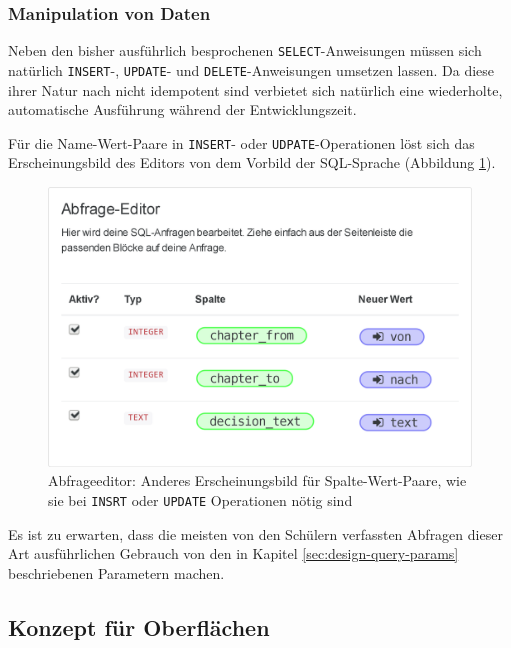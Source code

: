 \subsubsection{Manipulation von Daten}

Neben den bisher ausführlich besprochenen \texttt{SELECT}-Anweisungen müssen sich natürlich \texttt{INSERT}-, \texttt{UPDATE}- und \texttt{DELETE}-Anweisungen umsetzen lassen. Da diese ihrer Natur nach nicht idempotent sind verbietet sich natürlich eine wiederholte, automatische Ausführung während der Entwicklungszeit.


Für die Name-Wert-Paare in \texttt{INSERT}- oder \texttt{UDPATE}-Operationen löst sich das Erscheinungsbild des Editors von dem Vorbild der SQL-Sprache (Abbildung  \ref{fig:screen-sql-editor-insert-key-value-pairs}).

\begin{figure}[h]
  \includegraphics[width=\textwidth]{images/sql-insert-key-value-pairs}
  \caption{Abfrageeditor: Anderes Erscheinungsbild für Spalte-Wert-Paare, wie sie bei \texttt{INSRT} oder \texttt{UPDATE} Operationen nötig sind}
  \label{fig:screen-sql-editor-insert-key-value-pairs}
\end{figure}

Es ist zu erwarten, dass die meisten von den Schülern verfassten Abfragen dieser Art ausführlichen Gebrauch von den in Kapitel \ref{sec:design-query-params} beschriebenen Parametern machen.

\subsection{Konzept für Oberflächen}
\label{sec:design-ui-concept}

